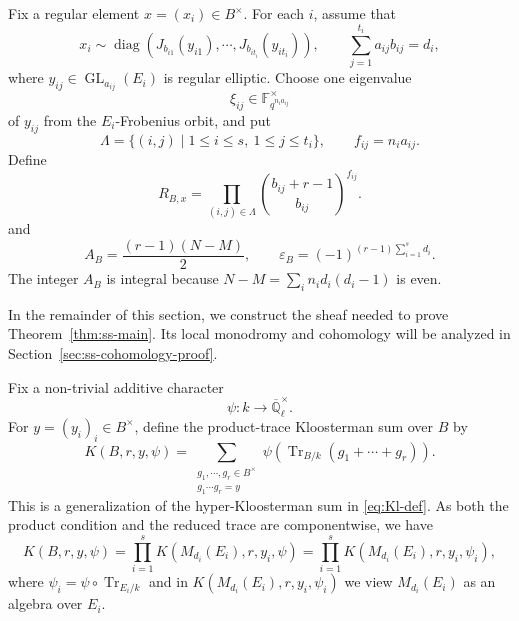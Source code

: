 \documentclass[11pt]{amsart}
\theoremstyle{remark}
\newcommand{\F}{\mathbb F}
\newcommand{\Ql}{\overline{\mathbb Q}_{\ell}}
\newcommand{\Tr}{\operatorname{Tr}}
\def\GL{\operatorname{GL}}
\begin{document}
Fix a regular element $x=(x_i)\in B^{\times}$. For each $i$, assume that
\begin{equation}\label{eq:ss-x-primary}
x_i\sim\operatorname{diag}\left(
J_{b_{i1}}(y_{i1}),\cdots,J_{b_{i t_i}}(y_{i t_i})\right), \qquad \sum_{j=1}^{t_i}a_{ij}b_{ij}=d_i,
\end{equation}
where $y_{ij}\in\GL_{a_{ij}}(E_i)$ is regular elliptic. Choose one
eigenvalue 
\begin{equation}\label{eq:ss-xi}
\xi_{ij}\in\F_{q^{n_i a_{ij}}}^{\times}
\end{equation}
of $y_{ij}$ from the $E_i$-Frobenius orbit, and put
\begin{equation}\label{eq:ss-lambda-data}
\Lambda=\{(i,j)\mid 1\le i\le s,~1\le j\le t_i\},
\qquad f_{ij}=n_i a_{ij}.
\end{equation}
Define
\begin{equation}\label{eq:ss-rank}
R_{B,x}=\prod_{(i,j)\in\Lambda}\binom{b_{ij}+r-1}{b_{ij}}^{f_{ij}}.
\end{equation}
and
\begin{equation}\label{eq:ss-prefactors}
A_B=\frac{(r-1)(N-M)}{2}, \qquad \varepsilon_B=(-1)^{(r-1)\sum_{i=1}^{s}d_i}.
\end{equation}
The integer $A_B$ is integral because
$N-M=\sum_i n_i d_i(d_i-1)$ is even.

In the remainder of this section, we construct the sheaf needed to prove
Theorem~\ref{thm:ss-main}.  Its local monodromy and cohomology will be analyzed in Section~\ref{sec:ss-cohomology-proof}.

Fix a non-trivial additive character
\[
\psi:k\longrightarrow \Ql^{\times}.
\]
For $y=(y_i)_i\in B^{\times}$, define the product-trace Kloosterman sum over $B$ by
\begin{equation}\label{eq:ss-KB}
K(B,r,y,\psi)=\sum_{\substack{g_1,\cdots,g_r\in B^{\times}\\g_1\cdots g_r=y}}\psi\left(\Tr_{B/k}(g_1+\cdots+g_r)\right).
\end{equation}
This is a generalization of the hyper-Kloosterman sum in \eqref{eq:Kl-def}. As both the product condition and the reduced trace are componentwise, we have 
\begin{equation}\label{eq:ss-factorization}
K(B,r,y,\psi)=\prod_{i=1}^{s}K(M_{d_i}(E_i),r,y_i,\psi)=\prod_{i=1}^{s}K(M_{d_i}(E_i),r,y_i,\psi_i),
\end{equation}
where $\psi_i=\psi\circ\Tr_{E_i/k}$ and in $K(M_{d_i}(E_i),r,y_i,\psi_i)$ we view $M_{d_i}(E_i)$ as an algebra over $E_i$.
\end{document}

